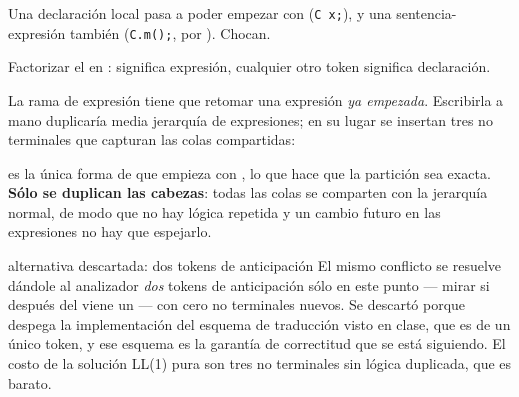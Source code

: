  Una declaración local pasa a poder empezar con
 (\texttt{C x;}), y una sentencia-expresión también (\texttt{C.m();}, por
). Chocan.

 Factorizar el  en :  significa expresión,
cualquier otro token significa declaración.
\begin{producciones}
\end{producciones}

La rama de expresión tiene que retomar una expresión \emph{ya empezada}. Escribirla a mano
duplicaría media jerarquía de expresiones; en su lugar se insertan tres no terminales que capturan
las colas compartidas:
\begin{producciones}
\end{producciones}
 es la única forma de  que empieza con , lo que
hace que la partición sea exacta. \textbf{Sólo se duplican las cabezas}: todas las colas se
comparten con la jerarquía normal, de modo que no hay lógica repetida y un cambio futuro en las
expresiones no hay que espejarlo.

\begin{decision}{alternativa descartada: dos tokens de anticipación}
El mismo conflicto se resuelve dándole al analizador \emph{dos} tokens de anticipación sólo en este
punto --- mirar si después del  viene un  --- con cero no terminales nuevos. Se
descartó porque despega la implementación del esquema de traducción visto en clase, que es de un
único token, y ese esquema es la garantía de correctitud que se está siguiendo. El costo de la
solución LL(1) pura son tres no terminales sin lógica duplicada, que es barato.
\end{decision}

